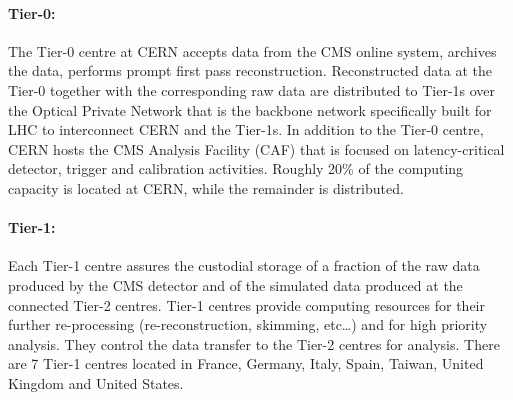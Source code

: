 \paragraph{Tier-0:}
The Tier-0 centre at CERN accepts data from the CMS online system, archives the data, performs prompt first pass reconstruction. Reconstructed data at the Tier-0 together with the corresponding raw data are distributed to Tier-1s over the Optical Private Network that is the backbone network specifically built for LHC to interconnect CERN and the Tier-1s.
In addition to the Tier-0 centre, CERN hosts the CMS Analysis Facility (CAF) that is focused on latency-critical detector, trigger and calibration activities.
Roughly 20\% of the computing capacity is located at CERN, while the remainder is distributed.

\paragraph{Tier-1:} 
Each Tier-1 centre assures the custodial storage of a fraction of the raw data produced by the CMS detector and of the simulated data produced at the connected Tier-2 centres. Tier-1 centres provide computing resources for their further re-processing (re-reconstruction, skimming, etc…) and for high priority analysis.
They control the data transfer to the Tier-2 centres for analysis. There are 7 Tier-1 centres located in France, Germany, Italy, Spain, Taiwan, United Kingdom and United States.


